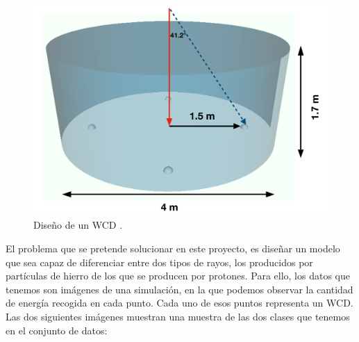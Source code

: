 \begin{figure}[H]
	\includegraphics[scale=.1]{imagenes/01_Introduccion/wcd.png}
	\centering
	\caption{Diseño de un WCD \cite{gonzalez2021tackling}.}
	\label{fig:wcdschema}
\end{figure}

El problema que se pretende solucionar en este proyecto, es diseñar un modelo que sea capaz de diferenciar entre dos tipos de rayos, los producidos por partículas de hierro de los que se producen por protones. Para ello, los datos que tenemos son imágenes de una simulación, en la que podemos observar la cantidad de energía recogida en cada punto. Cada uno de esos puntos representa un WCD. Las dos siguientes imágenes muestran una muestra de las dos clases que tenemos en el conjunto de datos:

